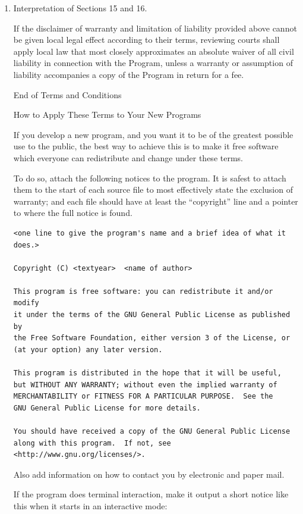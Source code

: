 \documentclass[12pt,a4paper]{book}
\begin{document}
\begin{enumerate}
\item Interpretation of Sections 15 and 16.

If the disclaimer of warranty and limitation of liability provided
above cannot be given local legal effect according to their terms,
reviewing courts shall apply local law that most closely approximates
an absolute waiver of all civil liability in connection with the
Program, unless a warranty or assumption of liability accompanies a
copy of the Program in return for a fee.

\begin{center}
{\Large\sc End of Terms and Conditions}

\bigskip
How to Apply These Terms to Your New Programs
\end{center}

If you develop a new program, and you want it to be of the greatest
possible use to the public, the best way to achieve this is to make it
free software which everyone can redistribute and change under these terms.

To do so, attach the following notices to the program.  It is safest
to attach them to the start of each source file to most effectively
state the exclusion of warranty; and each file should have at least
the ``copyright'' line and a pointer to where the full notice is found.

{\footnotesize
\begin{verbatim}
<one line to give the program's name and a brief idea of what it does.>

Copyright (C) <textyear>  <name of author>

This program is free software: you can redistribute it and/or modify
it under the terms of the GNU General Public License as published by
the Free Software Foundation, either version 3 of the License, or
(at your option) any later version.

This program is distributed in the hope that it will be useful,
but WITHOUT ANY WARRANTY; without even the implied warranty of
MERCHANTABILITY or FITNESS FOR A PARTICULAR PURPOSE.  See the
GNU General Public License for more details.

You should have received a copy of the GNU General Public License
along with this program.  If not, see <http://www.gnu.org/licenses/>.
\end{verbatim}
}

Also add information on how to contact you by electronic and paper mail.

If the program does terminal interaction, make it output a short
notice like this when it starts in an interactive mode:


\end{enumerate}
\end{document}
